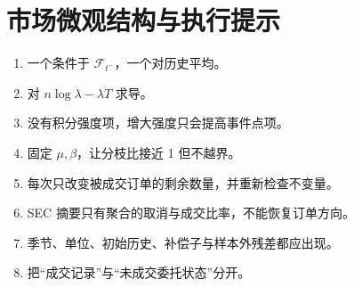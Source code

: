 \chapter{市场微观结构与执行提示}
\begin{enumerate}[leftmargin=*]
  \item 一个条件于 $\mathcal F_{t^-}$，一个对历史平均。
  \item 对 $n\log\lambda-\lambda T$ 求导。
  \item 没有积分强度项，增大强度只会提高事件点项。
  \item 固定 $\mu,\beta$，让分枝比接近 1 但不越界。
  \item 每次只改变被成交订单的剩余数量，并重新检查不变量。
  \item SEC 摘要只有聚合的取消与成交比率，不能恢复订单方向。
  \item 季节、单位、初始历史、补偿子与样本外残差都应出现。
  \item 把“成交记录”与“未成交委托状态”分开。
\end{enumerate}
